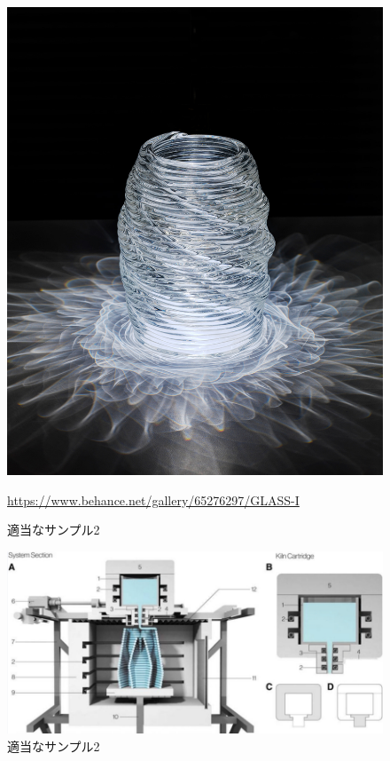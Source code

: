 \begin{figure}[H]
  \centering
  \includegraphics[width=6.4truecm]{./fig/Additive1.jpg}
  \caption{適当なサンプル2}
  \url{https://www.behance.net/gallery/65276297/GLASS-I} %
  \label{fig:ferret}
\end{figure}

\begin{figure}[H]
  \centering
  \includegraphics[width=15truecm]{./fig/Additive2.jpg}
  \caption{適当なサンプル2}
  \label{fig:ferret}
\end{figure}

